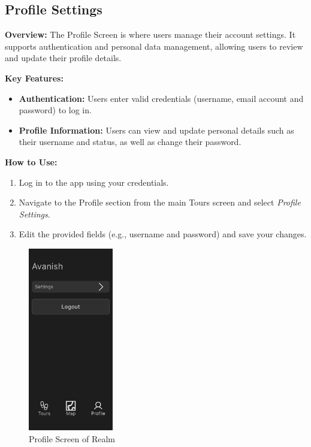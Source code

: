 \documentclass[12pt, titlepage]{article}
\newcommand{\progname}{Realm}
\begin{document}
\newpage
\subsection{Profile Settings}
\textbf{Overview:} The Profile Screen is where users manage their account settings. It supports authentication and personal data management, allowing users to review and update their profile details.

\textbf{Key Features:}
\begin{itemize}[leftmargin=*]
    \item \textbf{Authentication:} Users enter valid credentials (username, email account and password) to log in.
    \item \textbf{Profile Information:} Users can view and update personal details such as their username and status, as well as change their password.
\end{itemize}

\textbf{How to Use:}
\begin{enumerate}[leftmargin=*]
    \item Log in to the app using your credentials.
    \item Navigate to the Profile section from the main Tours screen and select \emph{Profile Settings}.
    \item Edit the provided fields (e.g., username and password) and save your changes.
\end{enumerate}

\begin{figure}[ht!]
    \centering
    \includegraphics[width=0.33\textwidth]{profile.png}
    \caption{Profile Screen of \progname{}}
    \label{fig:profile}
\end{figure}
\clearpage
\end{document}
